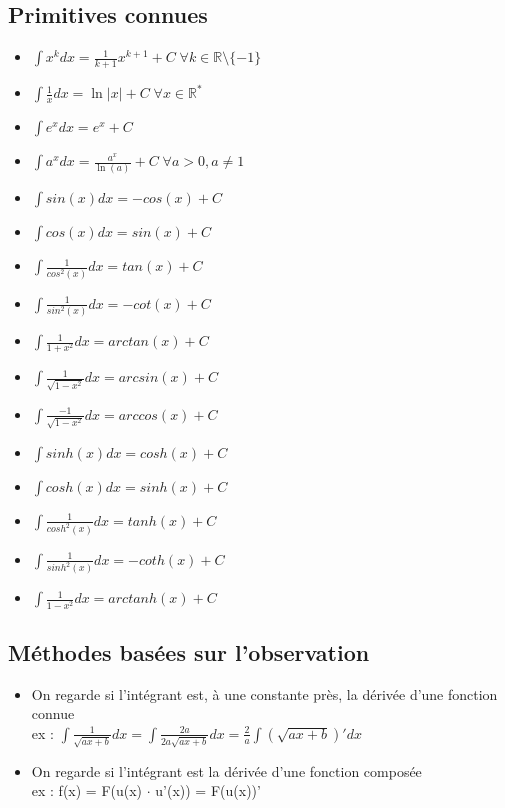 \documentclass{article}
\begin{document}
\subsection{Primitives connues}
\begin{itemize}
    \item $\int x^k dx = \frac{1}{k+1}x^{k+1} + C\;  \forall k \in \mathbb{R} \setminus\{-1\}$
    \item $\int \frac{1}{x} dx = \ln{|x|} + C\;  \forall x\in \mathbb{R}^*$
    \item $\int e^x dx = e^x + C$
    \item $\int a^x dx = \frac{a^x}{\ln{(a)}} + C\;  \forall a > 0, a \neq 1 $
    \item $\int sin(x) dx = -cos(x) + C$
    \item $\int cos(x) dx = sin(x) + C$
    \item $\int \frac{1}{cos^2(x)} dx = tan(x) + C$
    \item $\int \frac{1}{sin^2(x)} dx = -cot(x) + C$
    \item $\int \frac{1}{1 + x^2} dx = arctan(x) + C$
    \item $\int \frac{1}{\sqrt{1 - x^2}} dx = arcsin(x) + C$
    \item $\int \frac{-1}{\sqrt{1 - x^2}} dx = arccos(x) + C$
    \item $\int sinh(x) dx = cosh(x) + C$
    \item $\int cosh(x) dx = sinh(x) + C$
    \item $\int \frac{1}{cosh^2(x)} dx = tanh(x) + C$
    \item $\int \frac{1}{sinh^2(x)} dx = -coth(x) + C$
    \item $\int \frac{1}{1 - x^2} dx = arctanh(x) + C$
\end{itemize}

\subsection{Méthodes basées sur l'observation}
\begin{itemize}
    \item On regarde si l'intégrant est, à une constante près, la dérivée d'une fonction connue\\
    ex : $\int \frac{1}{\sqrt{ax + b}}dx = \int \frac{2a}{2a\sqrt{ax + b}}dx =\frac{2}{a} \int (\sqrt{ax + b})'dx$
    \item On regarde si l'intégrant est la dérivée d'une fonction composée \\
    ex : f(x) = F(u(x) $\cdot$ u'(x)) = F(u(x))'
\end{itemize}
\end{document}
